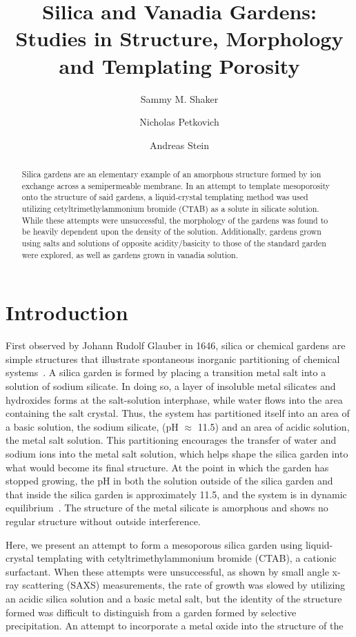\documentclass[
journal=jacsat, %
manuscript=article]{achemso}
\author{Sammy M. Shaker}
\author{Nicholas Petkovich}
\author{Andreas Stein}
\affiliation[University of Minnesota]
{Department of Chemistry, University of Minnesota Twin Cities, Minneapolis, Minnesota, }
\title[\texttt{achemso} demonstration]
{Silica and Vanadia Gardens: Studies in Structure, Morphology and Templating Porosity}
\begin{document}
\begin{abstract}
Silica gardens are an elementary example of an amorphous structure formed by ion exchange across a semipermeable membrane. In an attempt to template mesoporosity onto the structure of said gardens, a liquid-crystal templating method was used utilizing cetyltrimethylammonium bromide (CTAB) as a solute in silicate solution. While these attempts were unsuccessful, the morphology of the gardens was found to be heavily dependent upon the density of the solution. Additionally, gardens grown using salts and solutions of opposite acidity/basicity to those of the standard garden were explored, as well as gardens grown in vanadia solution.
\end{abstract}


\section*{Introduction}
First observed by Johann Rudolf Glauber in 1646, silica or chemical gardens are simple structures that illustrate spontaneous inorganic partitioning of chemical systems~\cite{Glauber}. A silica garden is formed by placing a transition metal salt into a solution of sodium silicate. In doing so, a layer of insoluble metal silicates and hydroxides forms at the salt-solution interphase, while water flows into the area containing the salt crystal. Thus, the system has partitioned itself into an area of a basic solution, the sodium silicate, (pH $\approx$ 11.5) and an area of acidic solution, the metal salt solution. This partitioning encourages the transfer of water and sodium ions into the metal salt solution, which helps shape the silica garden into what would become its final structure. At the point in which the garden has stopped growing, the pH in both the solution outside of the silica garden and that inside the silica garden is approximately 11.5, and the system is in dynamic equilibrium~\cite{Kunz}. The structure of the metal silicate is amorphous and shows no regular structure without outside interference. 

Here, we present an attempt to form a mesoporous silica garden using liquid-crystal templating with cetyltrimethylammonium bromide (CTAB), a cationic surfactant. When these attempts were unsuccessful, as shown by small angle x-ray scattering (SAXS) measurements, the rate of growth was slowed by utilizing an acidic silica solution and a basic metal salt, but the identity of the structure formed was difficult to distinguish from a garden formed by selective precipitation. An attempt to incorporate a metal oxide into the structure of the 
\end{document}
